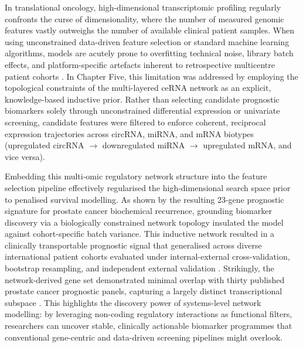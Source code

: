 In translational oncology, high-dimensional transcriptomic profiling regularly confronts the curse of dimensionality, where the number of measured genomic features vastly outweighs the number of available clinical patient samples. When using unconstrained data-driven feature selection or standard machine learning algorithms, models are acutely prone to overfitting technical noise, library batch effects, and platform-specific artefacts inherent to retrospective multicentre patient cohorts \cite{Riley2016Jun, Dhiman2021Oct, Steyerberg2015Apr}. In Chapter Five, this limitation was addressed by employing the topological constraints of the multi-layered ceRNA network as an explicit, knowledge-based inductive prior. Rather than selecting candidate prognostic biomarkers solely through unconstrained differential expression or univariate screening, candidate features were filtered to enforce coherent, reciprocal expression trajectories across circRNA, miRNA, and mRNA biotypes (upregulated circRNA $\rightarrow$ downregulated miRNA $\rightarrow$ upregulated mRNA, and vice versa).

Embedding this multi-omic regulatory network structure into the feature selection pipeline effectively regularised the high-dimensional search space prior to penalised survival modelling. As shown by the resulting 23-gene prognostic signature for prostate cancer biochemical recurrence, grounding biomarker discovery via a biologically constrained network topology insulated the model against cohort-specific batch variance. This inductive network resulted in a clinically transportable prognostic signal that generalised across diverse international patient cohorts evaluated under internal-external cross-validation, bootstrap resampling, and independent external validation \cite{Mortensen2015Nov, Harrell1996Feb, Steyerberg2015Apr}. Strikingly, the network-derived gene set demonstrated minimal overlap with thirty published prostate cancer prognostic panels, capturing a largely distinct transcriptional subspace \cite{Knezevic2013Oct, Cuzick2011Mar, Long2014Jun}. This highlights the discovery power of systems-level network modelling: by leveraging non-coding regulatory interactions as functional filters, researchers can uncover stable, clinically actionable biomarker programmes that conventional gene-centric and data-driven screening pipelines might overlook.

